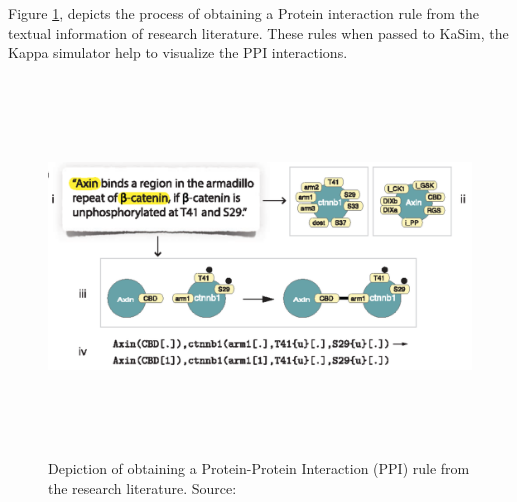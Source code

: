 \documentclass[msc,deptreport,ai]{infthesis}      %
\begin{document}
Figure \ref{fig:kappa}, depicts the process of obtaining a Protein interaction rule from the textual information of research literature. These rules when passed to KaSim, the Kappa simulator help to visualize the PPI interactions. 

\begin{figure}[H]
	\centering
	\captionsetup{justification=centering}
	\includegraphics[width=\linewidth,height=10cm,keepaspectratio]{kappa.png}	
	\caption{Depiction of obtaining a Protein-Protein Interaction (PPI) rule from the research literature. Source: \cite{kappaPlatform}}
	\label{fig:kappa}
\end{figure}
\end{document}
